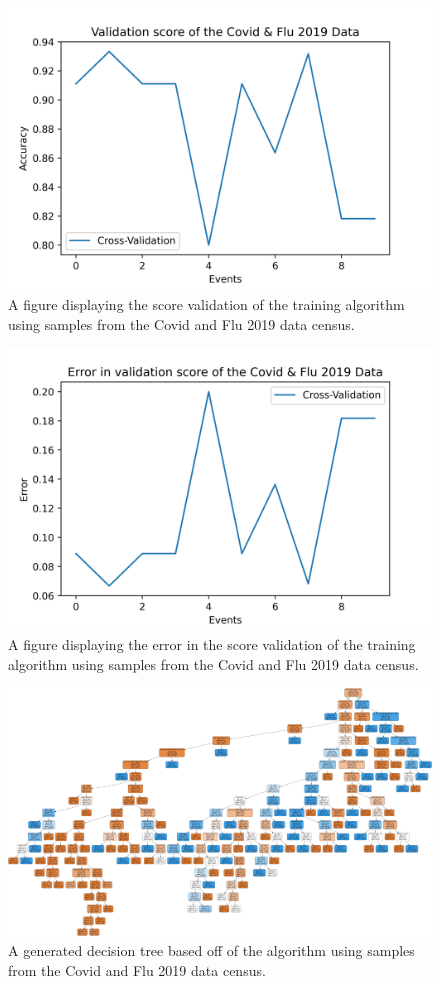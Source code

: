 \begin{figure}[H]
\centering
\includegraphics[scale=1]{Media/MediaContent/ScoreValidation.png}
\caption{A figure displaying the score validation of the training algorithm using samples from the Covid and Flu 2019 data census.}
\label{ValScore}
\end{figure}

\begin{figure}[H]
\centering
\includegraphics[scale=1]{Media/MediaContent/ErrorInValidation.png}
\caption{A figure displaying the error in the score validation of the training algorithm using samples from the Covid and Flu 2019 data census.}
\label{ErrScore}
\end{figure}

\newpage
\begin{figure}[H]
\centering
\includegraphics[angle=90, origin=c, scale=0.12]{Media/MediaContent/DecisionTree.png}
\caption{A generated decision tree based off of the algorithm using samples from the Covid and Flu 2019 data census.}
\label{DecTree}
\end{figure}